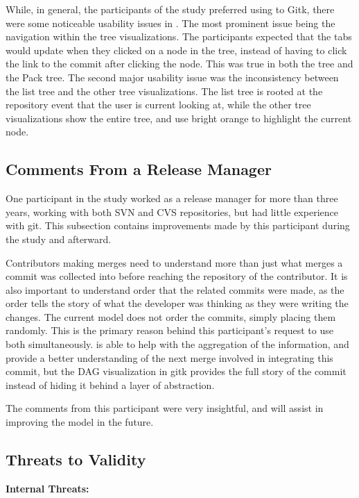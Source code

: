 While, in general, the participants of the study preferred using \tool
to Gitk, there were some noticeable usability issues in \tool. The most
prominent issue being the navigation within the tree visualizations. The
participants expected that the tabs would update when they clicked on a
node in the tree, instead of having to click the link to the commit
after clicking the node. This was true in both the \rt tree and the Pack
tree. The second major usability issue was the inconsistency between the
list tree and the other tree visualizations. The list tree is rooted at
the repository event that the user is current looking at, while the
other tree visualizations show the entire tree, and use bright orange to
highlight the current node.


\subsection{Comments From a Release Manager}
\label{sub:comments_from_a_release_manager}

One participant in the study worked as a release manager for more than
three years, working with both SVN and CVS repositories, but had little
experience with git. This subsection contains improvements made by this
participant during the study and afterward.

Contributors making merges need to understand more than just what merges
a commit was collected into before reaching the repository of the
contributor. It is also important to understand order that the related
commits were made, as the order tells the story of what the developer
was thinking as they were writing the changes. The current \mt model
does not order the commits, simply placing them randomly. This is the
primary reason behind this participant's request to use both
simultaneously. \tool is able to help with the aggregation of the
information, and provide a better understanding of the next merge
involved in integrating this commit, but the DAG visualization in gitk
provides the full story of the commit instead of hiding it behind a
layer of abstraction.

The comments from this participant were very insightful, and will assist
in improving the model in the future.

\subsection{Threats to Validity}
\label{sub:threats}

\textbf{Internal Threats:}

